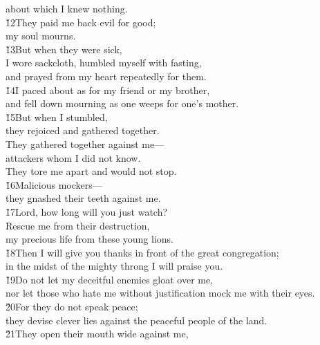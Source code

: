 \begin{poetry}
\poemlll       about which I knew nothing. \\
\poeml \v{12}They paid me back evil for good; \\
\poemll    my soul mourns. \\
\poeml \v{13}But when they were sick, \\
\poemll    I wore sackcloth, humbled myself with fasting, \\
\poemlll       and prayed from my heart repeatedly for them. \\
\poeml \v{14}I paced about as for my friend or my brother, \\
\poemll    and fell down mourning as one weeps for one's mother. \\
\poeml \v{15}But when I stumbled, \\
\poemll    they rejoiced and gathered together. \\
\poeml They gathered together against me--- \\
\poemll    attackers whom I did not know. \\
\poemlll       They tore me apart and would not stop. \\
\poeml \v{16}Malicious mockers--- \\
\poemll    they gnashed their teeth against me. \\
\poeml \v{17}Lord, how long will you just watch? \\
\poemll    Rescue me from their destruction, \\
\poemlll       my precious life from these young lions. \\
\poeml \v{18}Then I will give you thanks in front of the great congregation; \\
\poemll    in the midst of the mighty throng I will praise you. \\
\poeml \v{19}Do not let my deceitful enemies gloat over me, \\
\poemll    nor let those who hate me without justification mock me with their eyes. \\
\poeml \v{20}For they do not speak peace; \\
\poemll    they devise clever lies against the peaceful people of the land. \\
\poeml \v{21}They open their mouth wide against me, \\

\end{poetry}
